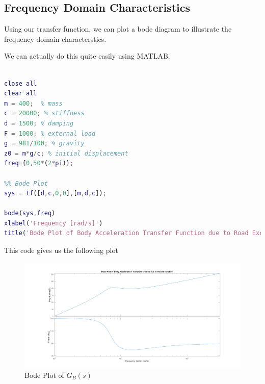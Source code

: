 \documentclass{article}
\begin{document}





\subsection{Frequency Domain Characteristics}
Using our transfer function, we can plot a bode diagram to illustrate the frequency domain characterstics.

\vspace{1em}

We can actually do this quite easily using MATLAB. 
\begin{lstlisting}[language=Matlab, caption={Script to Plot Bode Diagrams}]
%% Programm

close all
clear all
m = 400;  % mass
c = 20000; % stiffness
d = 1500; % damping
F = 1000; % external load
g = 981/100; % gravity
z0 = m*g/c; % initial displacement
freq={0,50*(2*pi)};

%% Bode Plot
sys = tf([d,c,0,0],[m,d,c]);

bode(sys,freq)
xlabel('Frequency [rad/s]')
title('Bode Plot of Body Acceleration Transfer Function due to Road Excitation')
\end{lstlisting}

This code gives us the following plot

\begin{figure} [H]
    \centering
    \includegraphics[width=1\linewidth]{BodePlot_SingleMass_Acc.png}
    \caption{Bode Plot of $G_B(s)$}
    \label{fig:BodePlot}
\end{figure}
\end{document}
